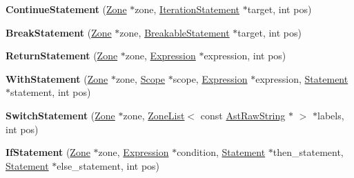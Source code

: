 \begin{DoxyCompactItemize}
\item 
\hypertarget{classv8_1_1internal_1_1_v8___f_i_n_a_l_ad4e92af3202390c2df088f715279ee4e}{}{\bfseries Continue\+Statement} (\hyperlink{classv8_1_1internal_1_1_zone}{Zone} $\ast$zone, \hyperlink{classv8_1_1internal_1_1_iteration_statement}{Iteration\+Statement} $\ast$target, int pos)\label{classv8_1_1internal_1_1_v8___f_i_n_a_l_ad4e92af3202390c2df088f715279ee4e}

\item 
\hypertarget{classv8_1_1internal_1_1_v8___f_i_n_a_l_ac074bfba23e942024c75e9c54c1a822f}{}{\bfseries Break\+Statement} (\hyperlink{classv8_1_1internal_1_1_zone}{Zone} $\ast$zone, \hyperlink{classv8_1_1internal_1_1_breakable_statement}{Breakable\+Statement} $\ast$target, int pos)\label{classv8_1_1internal_1_1_v8___f_i_n_a_l_ac074bfba23e942024c75e9c54c1a822f}

\item 
\hypertarget{classv8_1_1internal_1_1_v8___f_i_n_a_l_ad8bcb1b0ff9afa822c0560289bb9c95d}{}{\bfseries Return\+Statement} (\hyperlink{classv8_1_1internal_1_1_zone}{Zone} $\ast$zone, \hyperlink{classv8_1_1internal_1_1_expression}{Expression} $\ast$expression, int pos)\label{classv8_1_1internal_1_1_v8___f_i_n_a_l_ad8bcb1b0ff9afa822c0560289bb9c95d}

\item 
\hypertarget{classv8_1_1internal_1_1_v8___f_i_n_a_l_a9821c452691d41077a89bab2176e9ee4}{}{\bfseries With\+Statement} (\hyperlink{classv8_1_1internal_1_1_zone}{Zone} $\ast$zone, \hyperlink{classv8_1_1internal_1_1_v8___f_i_n_a_l_1_1_scope}{Scope} $\ast$scope, \hyperlink{classv8_1_1internal_1_1_expression}{Expression} $\ast$expression, \hyperlink{classv8_1_1internal_1_1_statement}{Statement} $\ast$statement, int pos)\label{classv8_1_1internal_1_1_v8___f_i_n_a_l_a9821c452691d41077a89bab2176e9ee4}

\item 
\hypertarget{classv8_1_1internal_1_1_v8___f_i_n_a_l_a1887bfe135c09faa6aef29fa2bec6ef8}{}{\bfseries Switch\+Statement} (\hyperlink{classv8_1_1internal_1_1_zone}{Zone} $\ast$zone, \hyperlink{classv8_1_1internal_1_1_zone_list}{Zone\+List}$<$ const \hyperlink{classv8_1_1internal_1_1_ast_raw_string}{Ast\+Raw\+String} $\ast$ $>$ $\ast$labels, int pos)\label{classv8_1_1internal_1_1_v8___f_i_n_a_l_a1887bfe135c09faa6aef29fa2bec6ef8}

\item 
\hypertarget{classv8_1_1internal_1_1_v8___f_i_n_a_l_a3afd9ef0a3aa26bca16665f48a24b3c9}{}{\bfseries If\+Statement} (\hyperlink{classv8_1_1internal_1_1_zone}{Zone} $\ast$zone, \hyperlink{classv8_1_1internal_1_1_expression}{Expression} $\ast$condition, \hyperlink{classv8_1_1internal_1_1_statement}{Statement} $\ast$then\+\_\+statement, \hyperlink{classv8_1_1internal_1_1_statement}{Statement} $\ast$else\+\_\+statement, int pos)\label{classv8_1_1internal_1_1_v8___f_i_n_a_l_a3afd9ef0a3aa26bca16665f48a24b3c9}


\end{DoxyCompactItemize}

